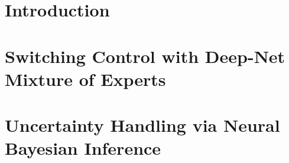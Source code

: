 \documentclass[12pt]{report}
\begin{document}

\begintext


\chapter{Introduction}

\chapter{Switching Control with Deep-Net Mixture of Experts}




\chapter{Uncertainty Handling via Neural Bayesian Inference}






{} 



{}
\appendix

\end{document}
